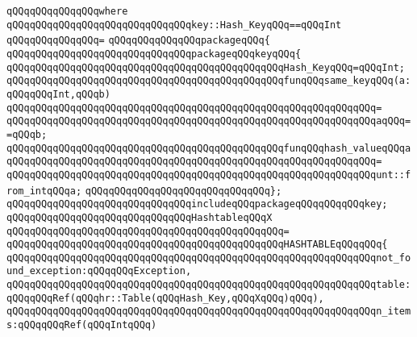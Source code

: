 \verb|qQQqqQQqqQQqqQQqwhere|\newline
\verb|qQQqqQQqqQQqqQQqqQQqqQQqqQQqqQQqkey::Hash_KeyqQQq==qQQqInt|\newline
\verb|qQQqqQQqqQQqqQQq=|\newline
\verb|qQQqqQQqqQQqqQQqpackageqQQq{|\newline
\newline
\verb|qQQqqQQqqQQqqQQqqQQqqQQqqQQqqQQqpackageqQQqkeyqQQq{|\newline
\newline
\verb|qQQqqQQqqQQqqQQqqQQqqQQqqQQqqQQqqQQqqQQqqQQqqQQqHash_KeyqQQq=qQQqInt;|\newline
\newline
\verb|qQQqqQQqqQQqqQQqqQQqqQQqqQQqqQQqqQQqqQQqqQQqqQQqfunqQQqsame_keyqQQq(a:qQQqqQQqInt,qQQqb)|\newline
\verb|qQQqqQQqqQQqqQQqqQQqqQQqqQQqqQQqqQQqqQQqqQQqqQQqqQQqqQQqqQQqqQQq=|\newline
\verb|qQQqqQQqqQQqqQQqqQQqqQQqqQQqqQQqqQQqqQQqqQQqqQQqqQQqqQQqqQQqqQQqaqQQq==qQQqb;|\newline
\newline
\verb|qQQqqQQqqQQqqQQqqQQqqQQqqQQqqQQqqQQqqQQqqQQqqQQqfunqQQqhash_valueqQQqa|\newline
\verb|qQQqqQQqqQQqqQQqqQQqqQQqqQQqqQQqqQQqqQQqqQQqqQQqqQQqqQQqqQQqqQQq=|\newline
\verb|qQQqqQQqqQQqqQQqqQQqqQQqqQQqqQQqqQQqqQQqqQQqqQQqqQQqqQQqqQQqqQQqunt::from_intqQQqa;|\newline
\verb|qQQqqQQqqQQqqQQqqQQqqQQqqQQqqQQq};|\newline
\newline
\verb|qQQqqQQqqQQqqQQqqQQqqQQqqQQqqQQqincludeqQQqpackageqQQqqQQqqQQqkey;|\newline
\newline
\newline
\verb|qQQqqQQqqQQqqQQqqQQqqQQqqQQqqQQqHashtableqQQqX|\newline
\verb|qQQqqQQqqQQqqQQqqQQqqQQqqQQqqQQqqQQqqQQqqQQqqQQq=|\newline
\verb|qQQqqQQqqQQqqQQqqQQqqQQqqQQqqQQqqQQqqQQqqQQqqQQqHASHTABLEqQQqqQQq{|\newline
\verb|qQQqqQQqqQQqqQQqqQQqqQQqqQQqqQQqqQQqqQQqqQQqqQQqqQQqqQQqqQQqqQQqnot_found_exception:qQQqqQQqException,|\newline
\verb|qQQqqQQqqQQqqQQqqQQqqQQqqQQqqQQqqQQqqQQqqQQqqQQqqQQqqQQqqQQqqQQqtable:qQQqqQQqRef(qQQqhr::Table(qQQqHash_Key,qQQqXqQQq)qQQq),|\newline
\verb|qQQqqQQqqQQqqQQqqQQqqQQqqQQqqQQqqQQqqQQqqQQqqQQqqQQqqQQqqQQqqQQqn_items:qQQqqQQqRef(qQQqIntqQQq)|\newline
